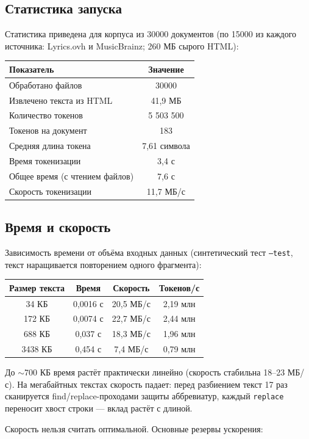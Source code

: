 \subsection{Статистика запуска}
Статистика приведена для корпуса из 30000 документов (по 15000 из каждого
источника: Lyrics.ovh и MusicBrainz; 260 МБ сырого HTML):

\begin{tabular}{|l|c|}
\hline
Показатель & Значение \\ \hline
Обработано файлов & 30000 \\ \hline
Извлечено текста из HTML & 41{,}9 МБ \\ \hline
Количество токенов & 5 503 500 \\ \hline
Токенов на документ & 183 \\ \hline
Средняя длина токена & 7{,}61 символа \\ \hline
Время токенизации & 3{,}4 с \\ \hline
Общее время (с чтением файлов) & 7{,}6 с \\ \hline
Скорость токенизации & 11{,}7 МБ/с \\ \hline
\end{tabular}

\subsection{Время и скорость}
Зависимость времени от объёма входных данных (синтетический тест
\texttt{--test}, текст наращивается повторением одного фрагмента):

\begin{tabular}{|c|c|c|c|}
\hline
Размер текста & Время & Скорость & Токенов/с \\ \hline
34 КБ & 0{,}0016 с & 20{,}5 МБ/с & 2{,}19 млн \\ \hline
172 КБ & 0{,}0074 с & 22{,}7 МБ/с & 2{,}44 млн \\ \hline
688 КБ & 0{,}037 с & 18{,}3 МБ/с & 1{,}96 млн \\ \hline
3438 КБ & 0{,}454 с & 7{,}4 МБ/с & 0{,}79 млн \\ \hline
\end{tabular}

До $\sim$700 КБ время растёт практически линейно (скорость стабильна
18--23 МБ/с). На мегабайтных текстах скорость падает: перед разбиением
текст 17 раз сканируется find/replace-проходами защиты аббревиатур, каждый
\texttt{replace} переносит хвост строки --- вклад растёт с длиной.

Скорость нельзя считать оптимальной. Основные резервы ускорения:

